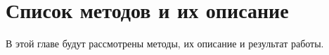 \newpage
\chapter{Список методов и их описание}

В этой главе будут рассмотрены методы, их описание и результат работы.








